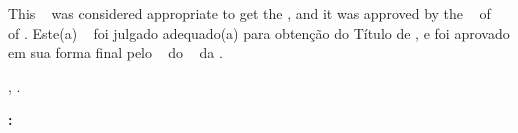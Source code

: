 


\begin{folhadeaprovacao}

    \begin{center}
        {\imprimirautor}

        \begin{center}
            \ABNTEXchapterfont\bfseries\MakeUppercase{\imprimirtitulo}\ifnotempty{\imprimirsubtitulo}{: \imprimirsubtitulo}
        \end{center}

        \begin{minipage}{\textwidth}
            \lang
            {
                This \imprimirtipotrabalho~ was considered appropriate to get the \imprimirformacao,
                and it was approved by the \imprimirprograma~ of \imprimircentro~ of \imprimirinstituicao.
            }
            {
                Este(a) \imprimirtipotrabalho~ foi julgado adequado(a) para obtenção do Título de \imprimirformacao,
                e foi aprovado em sua forma final pelo \imprimirprograma~
                do \imprimircentro~ da \imprimirinstituicao.
            }
         \end{minipage}%
    \end{center}

    \begin{center}
        \imprimirlocal, \imprimirdata.
    \end{center}


    \begin{flushleft}
        \textbf{:}
    \end{flushleft}

    \assinatura{%
        \textbf{\imprimirorientador} \\ \imprimirorientadorRotulo\\
        \imprimirinstituicao~--~\imprimirinstituicaosigla
    }

    \ifnotempty{\imprimircoorientador}{%
        \assinatura{%
            \textbf{\imprimircoorientador} \\ \imprimircoorientadorRotulo \\
            \imprimirinstituicao~--~\imprimirinstituicaosigla
        }
    }



\end{folhadeaprovacao}

